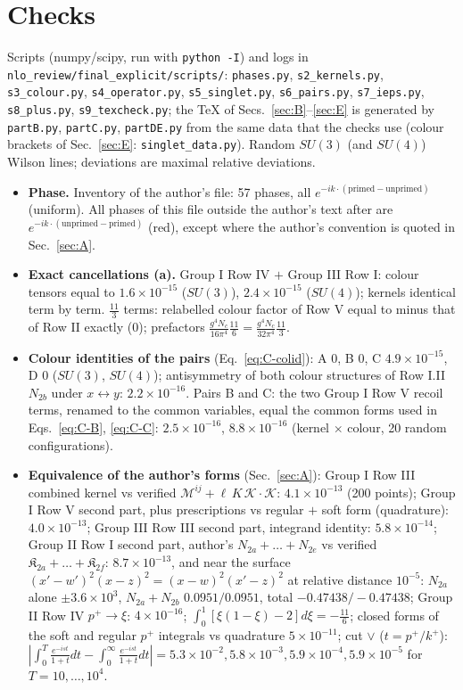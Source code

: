 \section{Checks}\label{sec:F}
\sloppy
\noindent Scripts (numpy/scipy, run with \texttt{python -I}) and logs in \texttt{nlo\_review/final\_explicit/scripts/}: \texttt{phases.py}, \texttt{s2\_kernels.py}, \texttt{s3\_colour.py}, \texttt{s4\_operator.py}, \texttt{s5\_singlet.py}, \texttt{s6\_pairs.py}, \texttt{s7\_ieps.py}, \texttt{s8\_plus.py}, \texttt{s9\_texcheck.py}; the TeX of Secs.~\ref{sec:B}--\ref{sec:E} is generated by \texttt{partB.py}, \texttt{partC.py}, \texttt{partDE.py} from the same data that the checks use (colour brackets of Sec.~\ref{sec:E}: \texttt{singlet\_data.py}). Random $SU(3)$ (and $SU(4)$) Wilson lines; deviations are maximal relative deviations.
\begin{itemize}
\item \textbf{Phase.} Inventory of the author's file: 57 phases, all $e^{-ik\cdot(\text{primed}-\text{unprimed})}$ (uniform). All phases of this file outside the author's text after \verb|| are $e^{-ik\cdot(\text{unprimed}-\text{primed})}$ (red), except where the author's convention is quoted in Sec.~\ref{sec:A}.
\item \textbf{Exact cancellations (a).} Group I Row IV $+$ Group III Row I: colour tensors equal to $1.6\times10^{-15}$ ($SU(3)$), $2.4\times10^{-15}$ ($SU(4)$); kernels identical term by term. $\frac{11}{3}$ terms: relabelled colour factor of Row V equal to minus that of Row II exactly ($0$); prefactors $\frac{g^{4}N_{c}}{16\pi^{4}}\frac{11}{6}=\frac{g^{4}N_{c}}{32\pi^{4}}\frac{11}{3}$.
\item \textbf{Colour identities of the pairs} (Eq.~\eqref{eq:C-colid}): A $0$, B $0$, C $4.9\times10^{-15}$, D $0$ ($SU(3)$, $SU(4)$); antisymmetry of both colour structures of Row I.II $N_{2b}$ under $x\leftrightarrow y$: $2.2\times10^{-16}$. Pairs B and C: the two Group I Row V recoil terms, renamed to the common variables, equal the common forms used in Eqs.~\eqref{eq:C-B}, \eqref{eq:C-C}: $2.5\times10^{-16}$, $8.8\times10^{-16}$ (kernel $\times$ colour, 20 random configurations).
\item \textbf{Equivalence of the author's forms} (Sec.~\ref{sec:A}): Group I Row III combined kernel vs verified $\mathcal{M}^{ij}+\ell\,K\,\mathcal{K}\cdot\mathcal{K}$: $4.1\times10^{-13}$ (200 points); Group I Row V second part, plus prescriptions vs regular $+$ soft form (quadrature): $4.0\times10^{-13}$; Group III Row III second part, integrand identity: $5.8\times10^{-14}$; Group II Row I second part, author's $N_{2a}+\dots+N_{2e}$ vs verified $\mathfrak{K}_{2a}+\dots+\mathfrak{K}_{2f}$: $8.7\times10^{-13}$, and near the surface $(x'-w')^{2}(x-z)^{2}=(x-w)^{2}(x'-z)^{2}$ at relative distance $10^{-5}$: $N_{2a}$ alone $\pm3.6\times10^{3}$, $N_{2a}+N_{2b}$ $0.0951/0.0951$, total $-0.47438/-0.47438$; Group II Row IV $p^{+}\to\xi$: $4\times10^{-16}$; $\int_{0}^{1}[\xi(1-\xi)-2]d\xi=-\frac{11}{6}$; closed forms of the soft and regular $p^{+}$ integrals vs quadrature $5\times10^{-11}$; cut $\vee$ ($t=p^{+}/k^{+}$): $|\int_{0}^{T}\frac{e^{-ist}}{1+t}dt-\int_{0}^{\infty}\frac{e^{-ist}}{1+t}dt|=5.3\times10^{-2},5.8\times10^{-3},5.9\times10^{-4},5.9\times10^{-5}$ for $T=10,\dots,10^{4}$.

\end{itemize}
